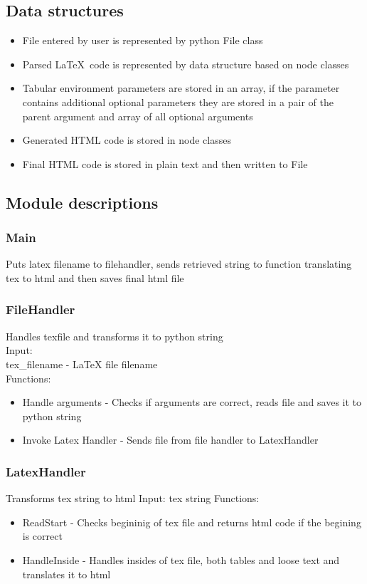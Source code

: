 \subsection{Data structures}
\begin{itemize}
\item File entered by user is represented by python File class 
\item Parsed \LaTeX \, code is represented by data structure based on node classes 
\item Tabular environment parameters are stored in an array, if the parameter contains additional optional parameters they are stored in a pair of the parent argument and array of all optional arguments 
\item Generated HTML code is stored in node classes 
\item Final HTML code is stored in plain text and then written to File
\end{itemize}

\subsection{Module descriptions}
\subsubsection{Main}
Puts latex filename to filehandler, sends retrieved string to function translating tex to html and then saves final html file 
\subsubsection{FileHandler}
Handles texfile and transforms it to python string \\ 
Input: \\ 
tex\_filename - LaTeX file filename \\ 
Functions: 
\begin{itemize}
    \item Handle arguments - Checks if arguments are correct, reads file and saves it to python string
    \item Invoke Latex Handler - Sends file from file handler to LatexHandler 
\end{itemize}
\subsubsection{LatexHandler}
Transforms tex string to html
Input: tex string
Functions: 
\begin{itemize}
    \item ReadStart - Checks begininig of tex file and returns html code if the begining is correct
    \item HandleInside - Handles insides of tex file, both tables and loose text and translates it to html
\end{itemize}
